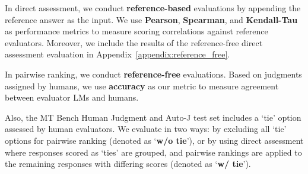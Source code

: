 \documentclass[11pt]{article}
\begin{document}
In direct assessment, we conduct \textbf{reference-based} evaluations by appending the reference answer as the input. We use \textbf{Pearson}, \textbf{Spearman}, and \textbf{Kendall-Tau} as performance metrics to measure scoring correlations against reference evaluators. Moreover, we include the results of the reference-free direct assessment evaluation in Appendix~\ref{appendix:reference_free}.

In pairwise ranking, we conduct \textbf{reference-free} evaluations. Based on judgments assigned by humans, we use \textbf{accuracy} as our metric to measure agreement between evaluator LMs and humans. 


Also, the MT Bench Human Judgment and Auto-J test set includes a `tie' option assessed by human evaluators. We evaluate in two ways: by excluding all `tie' options for pairwise ranking (denoted as `\textbf{w/o tie}'), or by using direct assessment where responses scored as `ties' are grouped, and pairwise rankings are applied to the remaining responses with differing scores (denoted as `\textbf{w/ tie}').




\end{document}
